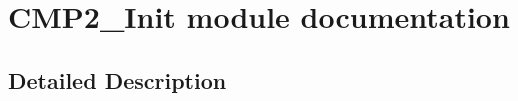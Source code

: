 \hypertarget{group___c_m_p2___init__module}{}\section{C\+M\+P2\+\_\+\+Init module documentation}
\label{group___c_m_p2___init__module}


\subsection{Detailed Description}
